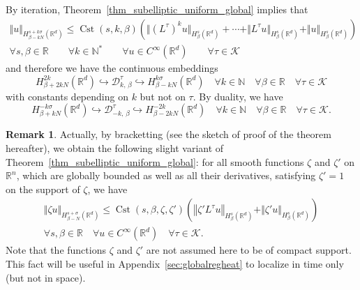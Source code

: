 \documentclass[10pt]{amsart}
\theoremstyle{definition}\newtheorem{defi}[theo]{Definition}\newtheorem{rema}[theo]{Remark}\newtheorem{exam}[theo]{Example}\newtheorem{exem}[theo]{Example}\newtheorem{nota}[theo]{Notation}
\newcommand*\R{\mathbb{R}}
\newcommand*\N{\mathbb{N}}
\newcommand{\calK}{\mathcal{K}}
\newcommand{\calD}{\mathcal{D}}
\DeclareMathOperator{\Cst}{Cst}
\renewcommand{\leq}{\leqslant}
\let\oldforall\forall
\renewcommand*{\forall}{\mathrel{\oldforall}}
\begin{document}
By iteration, Theorem~\ref{thm_subelliptic_uniform_global} implies that
\begin{multline*}
\Vert u\Vert_{H^{s+k\sigma}_{\beta-kN}\left(\R^d\right)} \leq \Cst(s,k,\beta) \left(\Vert (L^\tau)^k u\Vert_{H^s_\beta\left(\R^d\right)} + \cdots + \Vert L^\tau u\Vert_{H^s_\beta\left(\R^d\right)} + \Vert u\Vert_{H^s_\beta\left(\R^d\right)} \right) \\
\forall s,\beta\in\R\qquad \forall k\in\N^* \qquad \forall u\in C^\infty\left(\R^d\right) \qquad \forall\tau\in\calK
\end{multline*}
and therefore we have the continuous embeddings
\begin{equation}\label{inclusions_global}
H^{2k}_{\beta+2kN}\left(\R^d\right) \hookrightarrow \calD^\tau_{k,\,\beta} \hookrightarrow H^{k\sigma}_{\beta-kN}\left(\R^d\right)
\quad\forall k\in\N\quad\forall\beta\in\R\quad \forall\tau\in\calK
\end{equation}
with constants depending on $k$ but not on $\tau$. By duality, we have
\begin{equation}\label{inclusions_global_neg}
H^{-k\sigma}_{\beta+kN}\left(\R^d\right) \hookrightarrow \calD^\tau_{-k,\,\beta} \hookrightarrow H^{-2k}_{\beta-2kN}\left(\R^d\right) \quad\forall k\in\N\quad\forall\beta\in\R\quad \forall\tau\in\calK.
\end{equation}


\begin{rema}\label{rem_variant_thm_subelliptic_uniform_global}
Actually, by bracketting (see the sketch of proof of the theorem hereafter), we obtain the following slight variant of Theorem~\ref{thm_subelliptic_uniform_global}: for all smooth functions $\zeta$ and $\zeta'$ on $\R^n$, which are globally bounded as well as all their derivatives, satisfying $\zeta'=1$ on the support of $\zeta$, we have
\begin{multline*}
\Vert \zeta u\Vert_{H^{s+\sigma}_{\beta-N}\left(\R^d\right)} \leq \Cst(s,\beta,\zeta,\zeta') \left(\left\Vert \zeta' L^\tau u\right\Vert_{H^s_\beta\left(\R^d\right)} + \Vert \zeta' u\Vert_{H^s_\beta\left(\R^d\right)} \right) \\
\forall s,\beta\in\R \quad \forall u\in C^\infty\left(\R^d\right) \quad \forall\tau\in\calK.
\end{multline*}
Note that the functions $\zeta$ and $\zeta'$ are not assumed here to be of compact support. This fact will be useful in Appendix~\ref{sec:globalregheat} to localize in time only (but not in space).
\end{rema}
\end{document}
